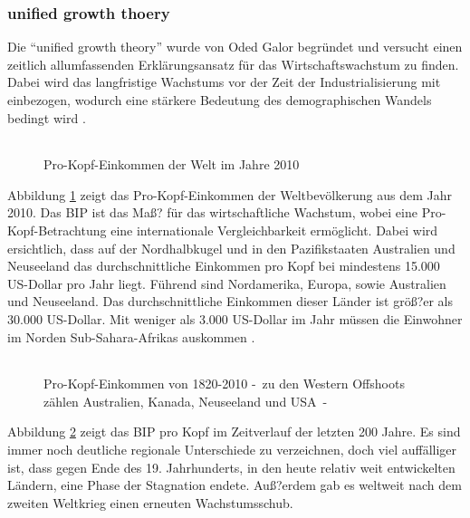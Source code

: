 \subsubsection*{unified growth thoery}\label{Unified}
Die "`unified growth theory"' wurde von Oded Galor begründet und versucht einen zeitlich allumfassenden Erklärungsansatz für das Wirtschaftswachstum zu finden. Dabei wird das langfristige Wachstums vor der Zeit der Industrialisierung mit einbezogen, wodurch eine stärkere Bedeutung des demographischen Wandels bedingt wird \cite{Galor.2011}.
%
	\begin{figure}[h!]
 		\centering 
		 \begin{tabular}{@{}r@{}} 
 		\end{tabular}  
		\caption[Pro-Kopf-Einkommen der Welt 2010]{Pro-Kopf-Einkommen der Welt im Jahre 2010}\label{KarteEinkommen}
	\end{figure}
%
Abbildung \ref{KarteEinkommen} zeigt das Pro-Kopf-Einkommen der Weltbevölkerung aus dem Jahr 2010. Das BIP ist das Maß? für das wirtschaftliche Wachstum, wobei eine Pro-Kopf-Betrachtung eine internationale Vergleichbarkeit ermöglicht. Dabei wird ersichtlich, dass auf der Nordhalbkugel und in den Pazifikstaaten Australien und Neuseeland das durchschnittliche Einkommen pro Kopf bei mindestens 15.000 US-Dollar pro Jahr liegt. Führend sind Nordamerika, Europa, sowie Australien und Neuseeland. Das durchschnittliche Einkommen dieser Länder ist größ?er als 30.000 US-Dollar. Mit weniger als 3.000 US-Dollar im Jahr müssen die Einwohner im Norden Sub-Sahara-Afrikas auskommen \cite[Kapitel 1]{Galor.2014}.\\
%		
		\begin{figure}[h!]
			\centering 
				\begin{tabular}{@{}r@{}}  
				\end{tabular}  
			\caption[Pro-Kopf-Einkommen 1820-2010]{Pro-Kopf-Einkommen von 1820-2010 -~zu den Western Offshoots zählen Australien, Kanada, Neuseeland und USA~-}\label{BIP200Jahre}
		\end{figure}
%		
Abbildung \ref{BIP200Jahre} zeigt das BIP pro Kopf im Zeitverlauf der letzten 200 Jahre. Es sind immer noch deutliche regionale Unterschiede zu verzeichnen, doch viel auffälliger ist, dass gegen Ende des 19. Jahrhunderts, in den heute relativ weit entwickelten Ländern, eine Phase der Stagnation endete. Auß?erdem gab es weltweit nach dem zweiten Weltkrieg einen erneuten Wachstumsschub.
